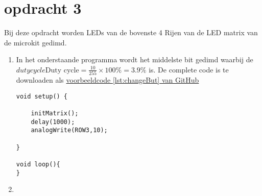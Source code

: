 \chapter{opdracht 3}

Bij deze opdracht worden LEDs van de bovenste 4 Rijen van de LED matrix van de microkit gedimd.
\begin{enumerate}[label=\Alph*.]
	\item In het onderstaande programma wordt het middelste bit gedimd waarbij de
	$ duty cycle \text{Duty cycle} = \frac{10}{255} \times 100\% = 3.9\%$ is.
	De complete code  is te downloaden als \href{https://github.com/JohnVi-hhs/embsysP/tree/main/voorbeelden/dimOpdracht.ino}{voorbeeldcode \ref{lst:changeBut} van GitHub}
	\begin{lstlisting}[caption= De micro:bit als een kompas,label={lst:dimInp}]
void setup() {  
	
	initMatrix();
	delay(1000);
	analogWrite(ROW3,10);
	
}

void loop(){
}

\end{lstlisting}

\item


	
\end{enumerate}

